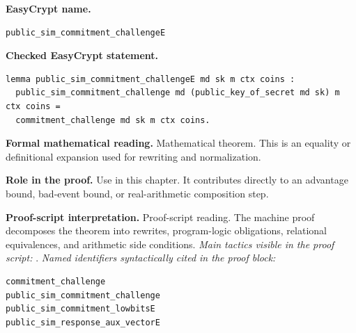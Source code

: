 \begin{formaltheorem}
\noindent\textbf{EasyCrypt name.}
\begin{lstlisting}[language=EasyCrypt,basicstyle=\ttfamily\scriptsize]
public_sim_commitment_challengeE
\end{lstlisting}
\noindent\textbf{Checked EasyCrypt statement.}
\begin{lstlisting}[language=EasyCrypt,basicstyle=\ttfamily\scriptsize]
lemma public_sim_commitment_challengeE md sk m ctx coins :
  public_sim_commitment_challenge md (public_key_of_secret md sk) m ctx coins =
  commitment_challenge md sk m ctx coins.
\end{lstlisting}
\noindent\textbf{Formal mathematical reading.}
Mathematical theorem. This is an equality or definitional expansion used for rewriting and normalization.

\noindent\textbf{Role in the proof.}
Use in this chapter. It contributes directly to an advantage bound, bad-event bound, or real-arithmetic composition step.

\noindent\textbf{Proof-script interpretation.}
Proof-script reading. The machine proof decomposes the theorem into rewrites, program-logic obligations, relational equivalences, and arithmetic side conditions.
\emph{Main tactics visible in the proof script:} .
\emph{Named identifiers syntactically cited in the proof block:}
\begin{lstlisting}[language=EasyCrypt,basicstyle=\ttfamily\scriptsize]
commitment_challenge
public_sim_commitment_challenge
public_sim_commitment_lowbitsE
public_sim_response_aux_vectorE
\end{lstlisting}

\end{formaltheorem}

